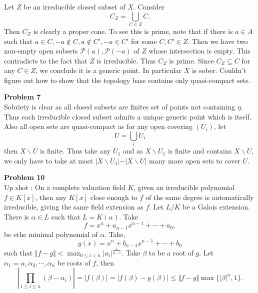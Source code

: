 \documentclass[10pt]{article}
\newcommand{\norm}[1]{\Vert #1 \Vert}
\newcommand{\ab}[1]{\vert #1 \vert}
\begin{document}
Let $Z$ be an irreducible closed subset of $X$. Consider
\begin{equation*}
    C_Z = \bigcup_{C\in Z}C.
\end{equation*}
Then $C_Z$ is clearly a proper cone. To see this is prime, note that if there is $a\in A$ such that $a\in C,-a\not\in C,a\not\in C',-a\in C'$ for some $C,C'\in Z$. Then we have two non-empty open subsets $\mathcal{P}(a),\mathcal{P}(-a)$ of $Z$ whose intersection is empty. This contradicts to the fact that $Z$ is irreducible. Thus $C_Z$ is prime.
Since $C_Z\subseteq C$ for any $C\in Z$, we conclude it is a generic point. In particular $X$ is sober. Couldn't figure out how to show that the topology base contains only quasi-compact sets.
\par\textbf{Problem 7}\\
Sobriety is clear as all closed subsets are finites set of points not containing $\eta$. Thus each irreducible closed subset admits a unique generic point which is itself. Also all open sets are quasi-compact as for any open covering $(U_i)$, let 
\begin{equation*}
    U = \bigcup_{i}U_i
\end{equation*}
then $X\backslash U$ is finite. Thus take any $U_1$ and as $X\backslash U_1$ is finite and contains $X\backslash U$, we only have to take at most $\vert X\backslash U_1\vert-\vert X\backslash U\vert$ many more open sets to cover $U$.
\par\textbf{Problem 10}\\
Up shot : On a complete valuation field $K$, given an irreducible polynomial $f\in K[x]$, then any $K[x]$ close enough to $f$ of the same degree is automatically irreducible, giving the same field extension as $f$. 
Let $L/K$ be a Galois extension. There is $\alpha\in L$ such that $L = K(\alpha)$. Take 
\begin{equation*}
    f = x^n+a_{n-1}x^{n-1}+\cdots+a_0,
\end{equation*}
be ethe minimal polynomial of $\alpha$. Take,
\begin{equation*}
    g(x) = x^n+b_{n-1}x^{n-1}+\cdots+b_0
\end{equation*}
such that $\norm{f-g}<\max_{0\leq i <n}\ab{a_i}^{{\frac 1 {n-i}}}$. Take $\beta$ to be a root of $g$. Let $\alpha_1=\alpha,\alpha_2,\cdots,\alpha_n$ be roots of $f$, then 
\begin{equation*}
    \left\vert\prod_{1\leq i\leq n}(\beta-\alpha_i)\right\vert = \ab{f(\beta)}=\ab{f(\beta)-g(\beta)} \leq \norm{f-g}\max\{\ab{\beta}^n,1\}.
\end{equation*}
\end{document}
